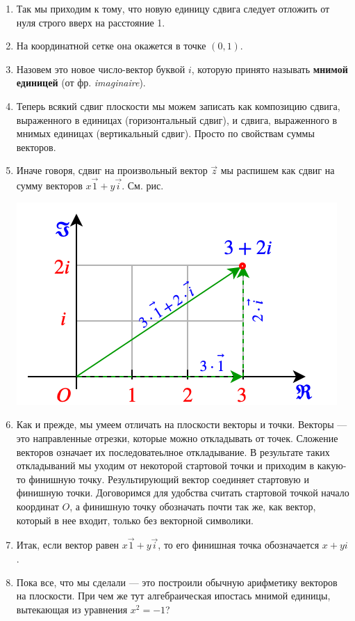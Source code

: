 \begin{enumerate}
\item Так мы приходим к тому, что новую единицу сдвига следует отложить от нуля строго вверх на расстояние 1.
\item На координатной сетке она окажется в точке $(0,1)$.
\item Назовем это новое число-вектор буквой $i$,  которую принято называть \textbf{мнимой единицей} (от фр. \textit{imaginaire}).
\item Теперь всякий сдвиг плоскости мы можем записать как композицию сдвига, выраженного в единицах (горизонтальный сдвиг), и сдвига, выраженного в мнимых единицах (вертикальный сдвиг). Просто по свойствам суммы векторов.
\item Иначе говоря, сдвиг на произвольный вектор $\vec z$ мы распишем как сдвиг на сумму векторов $x\vec 1+y\vec i$. См. рис.
\begin{center}
\includegraphics[scale=0.5]{complex.png}
\end{center}
\item Как и прежде, мы умеем отличать на плоскости векторы и точки. Векторы --- это направленные отрезки, которые можно откладывать от точек. Сложение векторов означает их последоватеьлное откладывание. В результате таких откладываний мы уходим от некоторой стартовой точки и приходим в какую-то финишную точку. Результирующий вектор соединяет стартовую и финишную точки. Договоримся для удобства считать стартовой точкой начало координат $O$, а финишную точку обозначать почти так же, как вектор, который в нее входит, только без векторной символики.
\item Итак, если вектор равен $x\vec 1+y\vec i$, то его финишная точка обозначается $x+yi$.
\item Пока все, что мы сделали --- это построили обычную арифметику векторов на плоскости. При чем же тут алгебраическая ипостась мнимой единицы, вытекающая из уравнения $x^2=-1$?

\end{enumerate}
